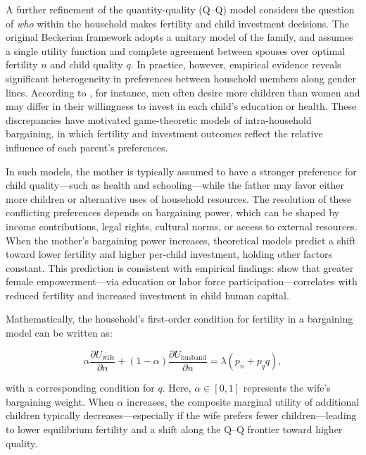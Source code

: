 \documentclass[]{AEA}
\begin{document}
A further refinement of the quantity-quality (Q--Q) model considers the
question of \emph{who} within the household makes fertility and child
investment decisions. The original Beckerian framework adopts a unitary
model of the family, and assumes a single utility function and complete
agreement between spouses over optimal fertility \(n\) and child quality
\(q\). In practice, however, empirical evidence reveals significant
heterogeneity in preferences between household members along gender
lines. According to \citet{oppenheim1987impact, thomas1990intra}, for
instance, men often desire more children than women and may differ in
their willingness to invest in each child's education or health. These
discrepancies have motivated game-theoretic models of intra-household
bargaining, in which fertility and investment outcomes reflect the
relative influence of each parent's preferences.

In such models, the mother is typically assumed to have a stronger
preference for child quality---such as health and schooling---while the
father may favor either more children or alternative uses of household
resources. The resolution of these conflicting preferences depends on
bargaining power, which can be shaped by income contributions, legal
rights, cultural norms, or access to external resources. When the
mother's bargaining power increases, theoretical models predict a shift
toward lower fertility and higher per-child investment, holding other
factors constant. This prediction is consistent with empirical findings:
\citet{iyigun2007endogenous, doepke2019bargaining} show that greater
female empowerment---via education or labor force
participation---correlates with reduced fertility and increased
investment in child human capital.

Mathematically, the household's first-order condition for fertility in a
bargaining model can be written as:

\[
\alpha \frac{\partial U_{\text{wife}}}{\partial n} + (1 - \alpha) \frac{\partial U_{\text{husband}}}{\partial n} = \lambda(p_n + p_q q),
\]

with a corresponding condition for \(q\). Here, \(\alpha \in [0,1]\)
represents the wife's bargaining weight. When \(\alpha\) increases, the
composite marginal utility of additional children typically
decreases---especially if the wife prefers fewer children---leading to
lower equilibrium fertility and a shift along the Q--Q frontier toward
higher quality.
\end{document}
